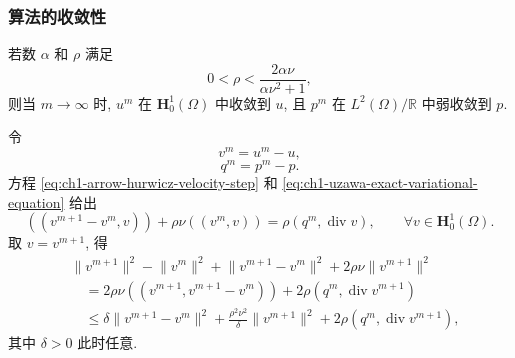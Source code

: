 \subsubsection*{算法的收敛性}

\begin{Theorem}
\label{thm:ch1-arrow-hurwicz-convergence}
若数 $\alpha$ 和 $\rho$ 满足
\begin{equation}
0<\rho<\frac{2\alpha\nu}{\alpha\nu^2+1},
\label{eq:ch1-arrow-hurwicz-step-condition}
\end{equation}
则当 $m\to\infty$ 时, $u^m$ 在 $\mathbf H_0^1(\Omega)$ 中收敛到 $u$, 且 $p^m$ 在 $L^2(\Omega)/\mathbb R$ 中弱收敛到 $p$.
\end{Theorem}

\begin{Proof}
令
\begin{equation}
v^m=u^m-u,
\label{eq:ch1-arrow-hurwicz-velocity-error}
\end{equation}
\begin{equation}
q^m=p^m-p.
\label{eq:ch1-arrow-hurwicz-pressure-error}
\end{equation}
方程 \eqref{eq:ch1-arrow-hurwicz-velocity-step} 和 \eqref{eq:ch1-uzawa-exact-variational-equation} 给出
\[
((v^{m+1}-v^m,v))+\rho\nu((v^m,v))
=\rho(q^m,\operatorname{div}v),
\qquad\forall v\in\mathbf H_0^1(\Omega).
\]
取 $v=v^{m+1}$, 得
\begin{equation}
\begin{aligned}
&\lVert v^{m+1}\rVert^2-\lVert v^m\rVert^2
+\lVert v^{m+1}-v^m\rVert^2
+2\rho\nu\lVert v^{m+1}\rVert^2\\
&\quad=2\rho\nu((v^{m+1},v^{m+1}-v^m))
+2\rho(q^m,\operatorname{div}v^{m+1})\\
&\quad\leq\delta\lVert v^{m+1}-v^m\rVert^2
+\frac{\rho^2\nu^2}{\delta}\lVert v^{m+1}\rVert^2
+2\rho(q^m,\operatorname{div}v^{m+1}),
\end{aligned}
\label{eq:ch1-arrow-hurwicz-velocity-energy}
\end{equation}
其中 $\delta>0$ 此时任意.


\end{Proof}
